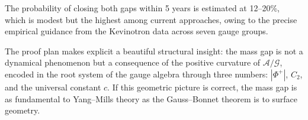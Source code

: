 \documentclass[11pt,a4paper]{amsart}
\theoremstyle{definition}
\theoremstyle{remark}
\newcommand{\calA}{\mathcal{A}}
\newcommand{\calG}{\mathcal{G}}
\newcommand{\PhiPlus}{\Phi^+}
\begin{document}
The probability of closing both gaps within 5 years is estimated at 12--20\%,
which is modest but the highest among current approaches, owing to the
precise empirical guidance from the Kevinotron data across seven gauge groups.

The proof plan makes explicit a beautiful structural insight: the mass gap
is not a dynamical phenomenon but a consequence of the positive curvature
of $\calA/\calG$, encoded in the root system of the gauge algebra through
three numbers: $|\PhiPlus|$, $C_2$, and the universal constant $c$. If
this geometric picture is correct, the mass gap is as fundamental to
Yang--Mills theory as the Gauss--Bonnet theorem is to surface geometry.

\end{document}
